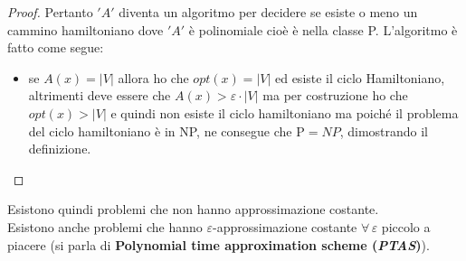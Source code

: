 \begin{proof}
												      		Pertanto $ 'A' $ diventa un algoritmo per decidere se esiste o meno un
												      		cammino hamiltoniano dove $ 'A' $ è polinomiale cioè è nella classe
												      		P. L’algoritmo è fatto come segue:
												      		\begin{itemize}
												      			\item se $A(x)=|V|$ allora ho che $opt(x)=|V|$ ed esiste il ciclo
												      			      Hamiltoniano, altrimenti deve essere che $A(x)>\varepsilon\cdot |V|$ ma per
												      			      costruzione ho che $opt(x)>|V|$ e quindi non esiste il ciclo hamiltoniano ma
												      			      poiché il problema del ciclo hamiltoniano è in NP, ne consegue che P$=NP$,
												      			      dimostrando il definizione.
												      		\end{itemize}
												      	\end{proof}
												      	Esistono quindi problemi che non hanno approssimazione costante.\\
												      	Esistono anche problemi che hanno $\varepsilon$-approssimazione costante
												      	$\forall\,\varepsilon$ piccolo a piacere (si parla di \textbf{Polynomial time
												      		approximation scheme (\textit{PTAS})}). 
